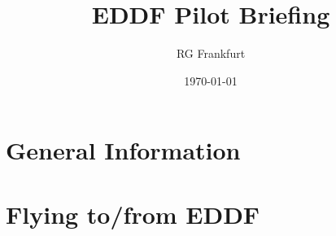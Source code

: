 \documentclass[10pt,a4paper]{article}
\begin{document}
\setlength{\parindent}{0pt}
\begin{titlepage}
\title{EDDF Pilot Briefing}
\author{RG Frankfurt}
\date{\today}
\maketitle
\end{titlepage}

\section{General Information}


\section{Flying to/from EDDF}


%
\end{document}
